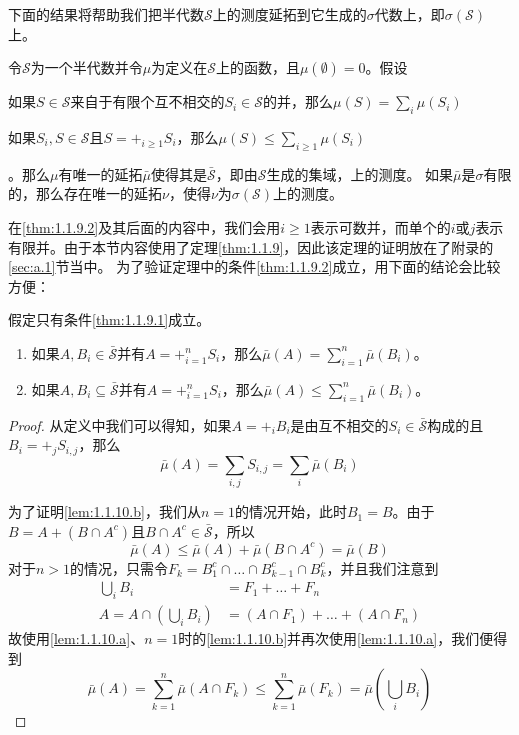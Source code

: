 \documentclass[../main.tex]{subfiles}
\begin{document}
下面的结果将帮助我们把半代数\(\mathcal{S}\)上的测度延拓到它生成的\(\sigma\)代数上，即\(\sigma(\mathcal{S})\)上。
\begin{theorem} \label{thm:1.1.9}
	令\(\mathcal{S}\)为一个半代数并令\(\mu\)为定义在\(\mathcal{S}\)上的函数，且\(\mu(\emptyset) = 0\)。假设\begin{enumerate*}
		\item \label{thm:1.1.9.1} 如果\(S \in \mathcal{S}\)来自于有限个互不相交的\(S_i \in \mathcal{S}\)的并，那么\(\mu(S) = \sum_i \mu(S_i)\)
		\item \label{thm:1.1.9.2} 如果\(S_i, S \in \mathcal{S}\)且\(S = +_{i \geq 1} S_i\)，那么\(\mu(S) \leq \sum_{i \geq 1} \allowbreak\mu(S_i)\)
	\end{enumerate*}。那么\(\mu\)有唯一的延拓\(\bar{\mu}\)使得其是\(\bar{\mathcal{S}}\)，即由\(\mathcal{S}\)生成的集域，上的测度。
	如果\(\bar{\mu}\)是\(\sigma\)有限的，那么存在唯一的延拓\(\nu\)，使得\(\nu\)为\(\sigma(\mathcal{S})\)上的测度。
\end{theorem}
在\ref{thm:1.1.9.2}及其后面的内容中，我们会用\(i \geq 1\)表示可数并，而单个的\(i\)或\(j\)表示有限并。由于本节内容使用了定理\ref{thm:1.1.9}，因此该定理的证明放在了附录的\ref{sec:a.1}节当中。
为了验证定理中的条件\ref{thm:1.1.9.2}成立，用下面的结论会比较方便：
\begin{lemma} \label{lem:1.1.10}
	假定只有条件\ref{thm:1.1.9.1}成立。
	\begin{enumerate}[label*=(\alph*)]
		\item \label{lem:1.1.10.a} 如果\(A, B_i \in \bar{\mathcal{S}}\)并有\(A = +_{i=1}^n S_i\)，那么\(\bar{\mu}(A) = \sum_{i=1}^n \bar{\mu}(B_i)\)。
		\item \label{lem:1.1.10.b} 如果\(A, B_i \subseteq \bar{\mathcal{S}}\)并有\(A = +_{i=1}^n S_i\)，那么\(\bar{\mu}(A) \leq \sum_{i=1}^n \bar{\mu}(B_i)\)。
	\end{enumerate}
\end{lemma}
\begin{proof}
	从定义中我们可以得知，如果\(A = +_i B_i\)是由互不相交的\(S_i \in \bar{\mathcal{S}}\)构成的且\(B_i = +_j S_{i,j}\)，那么
	\[\bar{\mu}(A) = \sum_{i,j} S_{i,j} = \sum_{i} \bar{\mu}(B_i) \]

	为了证明\ref{lem:1.1.10.b}，我们从\(n = 1\)的情况开始，此时\(B_1 = B\)。由于\(B = A + (B \cap A^c)\)且\(B \cap A^c \in \bar{\mathcal{S}}\)，所以
	\[\bar{\mu}(A) \leq \bar{\mu}(A) + \bar{\mu}(B \cap A^c) = \bar{\mu}(B)\]
	对于\(n > 1\)的情况，只需令\(F_k = B_1^c \cap \dots \cap B_{k-1}^c \cap B_k^c\)，并且我们注意到
	\[\begin{split}
		\bigcup_i B_i &= F_1 + \dots + F_n\\
		A = A \cap \left(\bigcup_i B_i\right) &= (A \cap F_1) + \dots + (A \cap F_n)
	\end{split}\]
	故使用\ref{lem:1.1.10.a}、\(n = 1\)时的\ref{lem:1.1.10.b}并再次使用\ref{lem:1.1.10.a}，我们便得到
	\[\bar{\mu}(A) = \sum_{k=1}^n \bar{\mu}(A \cap F_k) \leq \sum_{k=1}^n \bar{\mu}(F_k) = \bar{\mu}\left(\bigcup_i B_i\right)\]
\end{proof}
\end{document}
